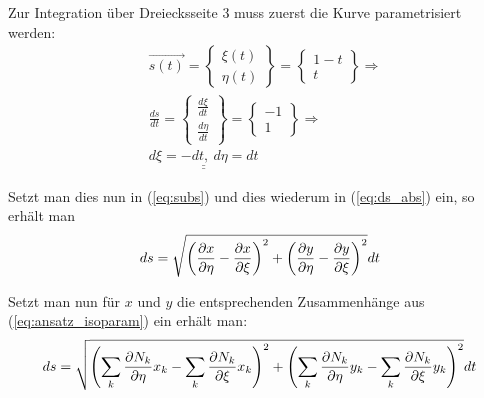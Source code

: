 Zur Integration über Dreiecksseite 3  muss zuerst die Kurve parametrisiert werden:
\begin{align*}
&\vec{s(t)} = 
\begin{Bmatrix}
\xi(t) \\ \eta(t)
\end{Bmatrix} = 
\begin{Bmatrix}
1 - t \\ t
\end{Bmatrix} \Rightarrow\\
%
&\frac{ds}{dt} = 
\begin{Bmatrix}
\frac{d\xi}{dt} \\ \frac{d\eta}{dt}
\end{Bmatrix} = 
\begin{Bmatrix}
-1 \\ 1
\end{Bmatrix} \Rightarrow \\
% 
&\underline{\underline{d\xi = -dt, \ d\eta = dt}}
\end{align*}

Setzt man dies nun in (\ref{eq:subs}) und dies wiederum in (\ref{eq:ds_abs}) ein, so erhält man
\begin{equation}
ds = \sqrt{\left(\frac{\partial x}{\partial \eta} - \frac{\partial x}{\partial \xi}\right)^2  + \left(\frac{\partial y}{\partial \eta} - \frac{\partial y}{\partial \xi}\right)^2} dt
\end{equation}

Setzt man nun für $x$ und $y$ die entsprechenden Zusammenhänge aus (\ref{eq:ansatz_isoparam}) ein erhält man:
\begin{equation}
ds = \sqrt{  \left(  \sum\limits_{k}\frac{\partial N_k}{\partial \eta}x_k  - \sum\limits_{k}\frac{\partial N_k}{\partial \xi}x_k  \right)^2 + \left(  \sum\limits_{k}\frac{\partial N_k}{\partial \eta}y_k  - \sum\limits_{k}\frac{\partial N_k}{\partial \xi}y_k  \right)^2  } dt
\end{equation}